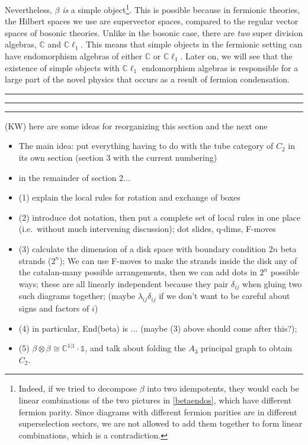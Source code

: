 \documentclass[12pt,a4paper]{article}
\newcommand{\unit}{\mathds{1}}
\newcommand{\cc}{\mathbb{C}}
\newcommand{\cl}{\mathbb{C}\ell}
\newcommand{\kw}[1]{{\color{kwcolor}\footnotesize{(KW) #1}}}
\newcommand{\kwsep}{\bigskip\hrule\medskip\hrule\medskip\hrule\bigskip}
\begin{document}
Nevertheless, $\beta$ {\it is} a simple object\footnote{Indeed, if we tried to decompose $\beta$ 
into two idempotents, they would each be linear combinations of the two pictures in \eqref{betaendos}, 
which have different fermion parity.
Since diagrams with different fermion parities are in different superselection sectors, 
we are not allowed to add them together to form linear combinations, which is a contradiction.}.
This is possible because in fermionic theories, the Hilbert spaces we use are supervector spaces, 
compared to the regular vector spaces of bosonic theories. 
Unlike in the bosonic case, there are {\it two} super division algebras, $\cc$ and $\cl_1$.
This means that simple objects in the fermionic setting can have endomorphism algebras of either $\cc$ or $\cl_1$.  
Later on, we will see that the existence of simple objects with $\cl_1$ endomorphism 
algebras is responsible for a large part of the novel physics that occurs as a result of fermion condensation. 

\kwsep

\kw{here are some ideas for reorganizing this section and the next one}

\begin{itemize}
\item The main idea: put everything having to do with the tube category of $C_2$ in its own section (section 3 with
the current numbering)
\item in the remainder of section 2...
\item (1) explain the local rules for rotation and exchange of boxes
\item (2) introduce dot notation, then put a complete set of local rules in one place (i.e.\ without
much intervening discussion); dot slides, q-dims, F-moves
\item (3) calculate the dimension of a disk space with boundary condition $2n$ beta strands ($2^n$);
We can use F-moves to make the strands inside the disk any of the catalan-many possible arrangements, 
then we can add dots in $2^n$ possible ways; these are all linearly independent because they pair $\delta_{ij}$
when gluing two such diagrams together; (maybe $\lambda_{ij}\delta_{ij}$ if we don't want to 
be careful about signs and factors of $i$)
\item (4) in particular, End(beta) is ... (maybe (3) above should come after this?); 
\item (5) $\beta\otimes\beta\cong \mathbb C^{1|1}\cdot\unit$,
and talk about folding the $A_3$ principal graph to obtain $C_2$.
\end{itemize}
\end{document}
